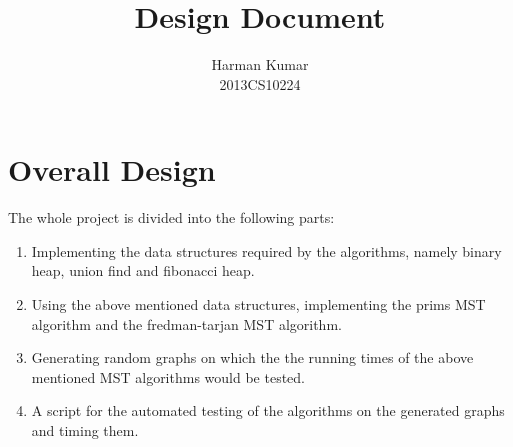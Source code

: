 \documentclass[]{article}
\begin{document}
\author{
		Harman Kumar\\
		2013CS10224		
		}

\title{Design Document}
\maketitle







\section{Overall Design}

\begin{flushleft}
The whole project is divided into the following parts:

\begin{enumerate}

\item Implementing the data structures required by the algorithms, namely binary heap, union find and fibonacci heap.

\item Using the above mentioned data structures, implementing the prims MST algorithm and the fredman-tarjan MST algorithm.

\item Generating random graphs on which the the running times of the above mentioned MST algorithms would be tested. 

\item A script for the automated testing of the algorithms on the generated graphs and timing them.  

\end{enumerate} 

\end{flushleft} 
\end{document}
